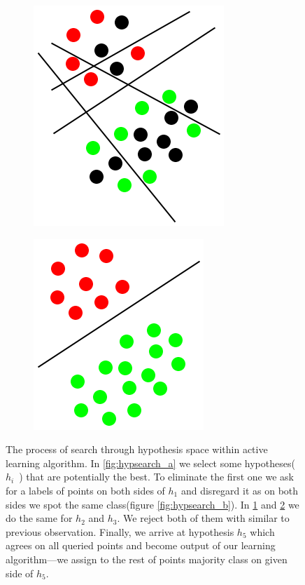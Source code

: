 \documentclass[12pt, a4paper, pdflatex, leqno, twoside]{report}
\begin{document}
\begin{figure}[htbp]
\begin{subfigure}[b]{0.3\textwidth}
    \caption{\label{fig:hypsearch_c}}
  \end{subfigure}
  \begin{subfigure}[b]{0.3\textwidth}
    \centering
    \includegraphics[width=0.5\linewidth]{graphics/hypsearch4.png}
    \caption{\label{fig:hypsearch_d}}
  \end{subfigure}
  \begin{subfigure}[b]{0.3\textwidth}
    \centering
    \includegraphics[width=0.5\linewidth]{graphics/hypsearch5.png}
    \caption{\label{fig:hypsearch_e}}
  \end{subfigure}
\begin{tiny}
\caption{The process of search through hypothesis space within active learning 
algorithm. In \ref{fig:hypsearch_a} we select some hypotheses(~$h_i$~) that 
are potentially the best. To eliminate the first one we ask for a labels of points on 
both sides of $h_1$ and disregard it as on both sides we spot the same class(figure \ref{fig:hypsearch_b}). In \ref{fig:hypsearch_c} and 
\ref{fig:hypsearch_d} we do the same for $h_2$ and $h_3$. We reject both of 
them with similar to previous observation. Finally, we arrive at hypothesis 
$h_5$ which agrees on all queried points and become output of our learning 
algorithm---we assign to the rest of points majority class on given side of 
$h_5$.\label{fig:hypsearch}}
\end{tiny}
\vspace{1cm}
\end{figure}
\end{document}
